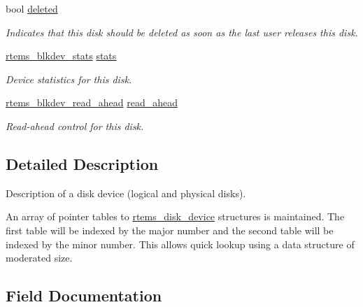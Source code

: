 \begin{DoxyCompactItemize}
bool \mbox{\hyperlink{structrtems__disk__device_aaa1f93e5ae3f153a048a78490acef04e}{deleted}}
\begin{DoxyCompactList}\small\item\em Indicates that this disk should be deleted as soon as the last user releases this disk. \end{DoxyCompactList}\item 
\mbox{\label{structrtems__disk__device_a43d48173fc70d4cc91f5cd137ca6a389}} 
\mbox{\hyperlink{structrtems__blkdev__stats}{rtems\+\_\+blkdev\+\_\+stats}} \mbox{\hyperlink{structrtems__disk__device_a43d48173fc70d4cc91f5cd137ca6a389}{stats}}
\begin{DoxyCompactList}\small\item\em Device statistics for this disk. \end{DoxyCompactList}\item 
\mbox{\label{structrtems__disk__device_a7c816f82e642b9bb71403e69b1b6a14b}} 
\mbox{\hyperlink{structrtems__blkdev__read__ahead}{rtems\+\_\+blkdev\+\_\+read\+\_\+ahead}} \mbox{\hyperlink{structrtems__disk__device_a7c816f82e642b9bb71403e69b1b6a14b}{read\+\_\+ahead}}
\begin{DoxyCompactList}\small\item\em Read-\/ahead control for this disk. \end{DoxyCompactList}\end{DoxyCompactItemize}


\subsection{Detailed Description}
Description of a disk device (logical and physical disks). 

An array of pointer tables to \mbox{\hyperlink{structrtems__disk__device}{rtems\+\_\+disk\+\_\+device}} structures is maintained. The first table will be indexed by the major number and the second table will be indexed by the minor number. This allows quick lookup using a data structure of moderated size. 

\subsection{Field Documentation}
\mbox{\label{structrtems__disk__device_a3afc4d8f96a873b8e2340b8e978584c6}} 
